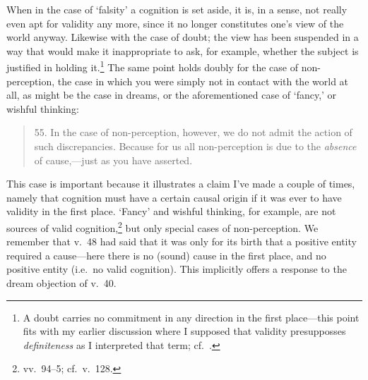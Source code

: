 \documentclass[11pt,letterpaper,oneside]{amsart}
\newenvironment{squote}{\begin{quote}\sf\small}{\rm\end{quote}} %
\begin{document}
When in the case of `falsity' a cognition is set aside, it is, in a sense, not really even apt for validity any more, since it no longer constitutes one's view of the world anyway. Likewise with the case of doubt; the view has been suspended in a way that would make it inappropriate to ask, for example, whether the subject is justified in holding it.\footnote{A doubt carries no commitment in any direction in the first place---this point fits with my earlier discussion where I supposed that validity presupposses \emph{definiteness} as I interpreted that term; cf.\ \citet[pp.\ 93--5]{bhatt1962epistemology}.} The same point holds doubly for the case of non-perception, the case in which you were simply not in contact with the world at all, as might be the case in dreams, or the aforementioned case of `fancy,' or wishful thinking:\begin{squote}55. In the case of non-perception, however, we do not admit the action of such discrepancies. Because for us all non-perception is due to the \emph{absence} of cause,---just as you have asserted.\end{squote} This case is important because it illustrates a claim I've made a couple of times, namely that cognition must have a certain causal origin if it was ever to have validity in the first place. `Fancy' and wishful thinking, for example, are not sources of valid cognition,\footnote{vv.\ 94--5; cf.\ v.\ 128.} but only special cases of non-perception. We remember that v.\ 48 had said that it was only for its birth that a positive entity required a cause---here there is no (sound) cause in the first place, and no positive entity (i.e.\ no valid cognition). This implicitly offers a response to the dream objection of v.\ 40.





\end{document}
